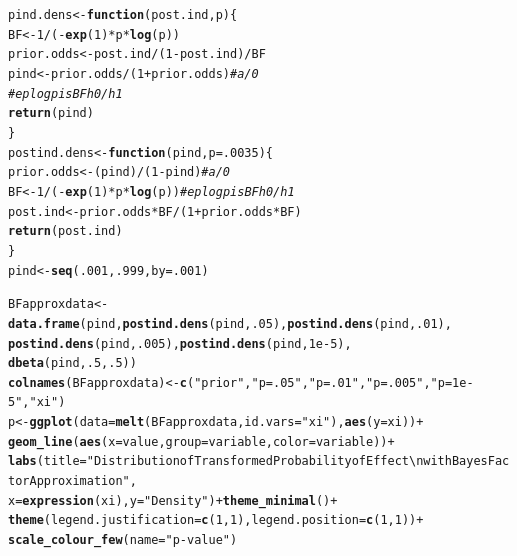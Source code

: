 \documentclass[AMA,STIX1COL]{WileyNJD-v2}\usepackage[]{graphicx}\usepackage[]{color}
\makeatletter
\newcommand{\hlnum}[1]{\textcolor[rgb]{0.686,0.059,0.569}{#1}}%
\newcommand{\hlstr}[1]{\textcolor[rgb]{0.192,0.494,0.8}{#1}}%
\newcommand{\hlcom}[1]{\textcolor[rgb]{0.678,0.584,0.686}{\textit{#1}}}%
\newcommand{\hlopt}[1]{\textcolor[rgb]{0,0,0}{#1}}%
\newcommand{\hlstd}[1]{\textcolor[rgb]{0.345,0.345,0.345}{#1}}%
\newcommand{\hlkwa}[1]{\textcolor[rgb]{0.161,0.373,0.58}{\textbf{#1}}}%
\newcommand{\hlkwb}[1]{\textcolor[rgb]{0.69,0.353,0.396}{#1}}%
\newcommand{\hlkwc}[1]{\textcolor[rgb]{0.333,0.667,0.333}{#1}}%
\newcommand{\hlkwd}[1]{\textcolor[rgb]{0.737,0.353,0.396}{\textbf{#1}}}%
\newenvironment{kframe}{%
 \def\at@end@of@kframe{}%
 \ifinner\ifhmode%
  \def\at@end@of@kframe{\end{minipage}}%
  \begin{minipage}{\columnwidth}%
 \fi\fi%
 \def\FrameCommand##1{\hskip\@totalleftmargin \hskip-\fboxsep
 \colorbox{shadecolor}{##1}\hskip-\fboxsep
     \hskip-\linewidth \hskip-\@totalleftmargin \hskip\columnwidth}%
 \MakeFramed {\advance\hsize-\width
   \@totalleftmargin\z@ \linewidth\hsize
   \@setminipage}}%
 {\par\unskip\endMakeFramed%
 \at@end@of@kframe}
\newenvironment{knitrout}{}{} %
\makeatother
\begin{document}
\begin{knitrout}
\color{fgcolor}\begin{kframe}
\begin{alltt}
\hlstd{pind.dens}\hlkwb{<-}\hlkwa{function}\hlstd{(}\hlkwc{post.ind}\hlstd{,}\hlkwc{p}\hlstd{)\{}
  \hlstd{BF}\hlkwb{<-} \hlnum{1}\hlopt{/}\hlstd{(}\hlopt{-}\hlkwd{exp}\hlstd{(}\hlnum{1}\hlstd{)}\hlopt{*}\hlstd{p}\hlopt{*}\hlkwd{log}\hlstd{(p))}
  \hlstd{prior.odds}\hlkwb{<-}\hlstd{post.ind}\hlopt{/}\hlstd{(}\hlnum{1}\hlopt{-}\hlstd{post.ind)}\hlopt{/}\hlstd{BF}
  \hlstd{pind}\hlkwb{<-} \hlstd{prior.odds}\hlopt{/}\hlstd{(}\hlnum{1}\hlopt{+}\hlstd{prior.odds)} \hlcom{#a/0}
  \hlcom{#eplogp is BF h0/h1}
  \hlkwd{return}\hlstd{(pind)}
  \hlstd{\}}
\hlstd{postind.dens}\hlkwb{<-}\hlkwa{function}\hlstd{(}\hlkwc{pind}\hlstd{,} \hlkwc{p}\hlstd{=}\hlnum{.0035}\hlstd{)\{}
  \hlstd{prior.odds}\hlkwb{<-} \hlstd{(pind)}\hlopt{/}\hlstd{(}\hlnum{1}\hlopt{-}\hlstd{pind)} \hlcom{#a/0}
  \hlstd{BF}\hlkwb{<-} \hlnum{1}\hlopt{/}\hlstd{(}\hlopt{-}\hlkwd{exp}\hlstd{(}\hlnum{1}\hlstd{)}\hlopt{*}\hlstd{p}\hlopt{*}\hlkwd{log}\hlstd{(p))} \hlcom{#eplogp is BF h0/h1}
  \hlstd{post.ind}\hlkwb{<-}\hlstd{prior.odds}\hlopt{*}\hlstd{BF}\hlopt{/}\hlstd{(}\hlnum{1}\hlopt{+}\hlstd{prior.odds}\hlopt{*}\hlstd{BF)}
  \hlkwd{return}\hlstd{(post.ind)}
\hlstd{\}}
\hlstd{pind}\hlkwb{<-} \hlkwd{seq}\hlstd{(}\hlnum{.001}\hlstd{,} \hlnum{.999}\hlstd{,}\hlkwc{by}\hlstd{=}\hlnum{.001}\hlstd{)}

\hlstd{BFapproxdata}\hlkwb{<-}\hlkwd{data.frame}\hlstd{(pind,} \hlkwd{postind.dens}\hlstd{(pind,} \hlnum{.05}\hlstd{),}\hlkwd{postind.dens}\hlstd{(pind,} \hlnum{.01}\hlstd{),}
                         \hlkwd{postind.dens}\hlstd{(pind,} \hlnum{.005}\hlstd{),}\hlkwd{postind.dens}\hlstd{(pind,} \hlnum{1e-5}\hlstd{),}
                   \hlkwd{dbeta}\hlstd{(pind,}\hlnum{.5}\hlstd{,}\hlnum{.5}\hlstd{))}
\hlkwd{colnames}\hlstd{(BFapproxdata)}\hlkwb{<-}\hlkwd{c}\hlstd{(}\hlstr{"prior"}\hlstd{,} \hlstr{"p = .05"}\hlstd{,} \hlstr{"p = .01"}\hlstd{,} \hlstr{"p = .005"}\hlstd{,} \hlstr{"p = 1e-5"}\hlstd{,}\hlstr{"xi"}\hlstd{)}
\hlstd{p}\hlkwb{<-} \hlkwd{ggplot}\hlstd{(}\hlkwc{data}\hlstd{=}\hlkwd{melt}\hlstd{(BFapproxdata,}\hlkwc{id.vars} \hlstd{=} \hlstr{"xi"}\hlstd{),} \hlkwd{aes}\hlstd{(}\hlkwc{y}\hlstd{=xi))}\hlopt{+}
  \hlkwd{geom_line}\hlstd{(}\hlkwd{aes}\hlstd{(}\hlkwc{x}\hlstd{=value,} \hlkwc{group}\hlstd{=variable,}\hlkwc{color}\hlstd{=variable))}\hlopt{+}
  \hlkwd{labs}\hlstd{(}\hlkwc{title} \hlstd{=} \hlstr{"Distribution of Transformed Probability of Effect\textbackslash{}n with Bayes Factor Approximation"}\hlstd{,}
       \hlkwc{x} \hlstd{=} \hlkwd{expression}\hlstd{(xi),} \hlkwc{y} \hlstd{=} \hlstr{"Density"}\hlstd{)}\hlopt{+}  \hlkwd{theme_minimal}\hlstd{()}\hlopt{+}
  \hlkwd{theme}\hlstd{(}\hlkwc{legend.justification}\hlstd{=}\hlkwd{c}\hlstd{(}\hlnum{1}\hlstd{,}\hlnum{1}\hlstd{),} \hlkwc{legend.position}\hlstd{=}\hlkwd{c}\hlstd{(}\hlnum{1}\hlstd{,}\hlnum{1}\hlstd{))} \hlopt{+}
  \hlkwd{scale_colour_few}\hlstd{(}\hlkwc{name}\hlstd{=}\hlstr{"p-value"}\hlstd{)}
\end{alltt}
\end{kframe}
\end{knitrout}
\end{document}
